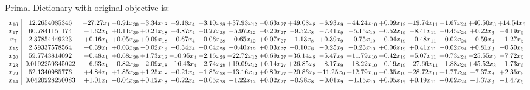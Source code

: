 \documentclass[9pt]{article}
\begin{document}
Primal Dictionary with original objective is:
\[\begin{array}{c| c c@{\hskip 2pt} c@{\hskip 2pt} c@{\hskip 2pt} c@{\hskip 2pt} c@{\hskip 2pt} c@{\hskip 2pt} c@{\hskip 2pt} c@{\hskip 2pt} c@{\hskip 2pt} c@{\hskip 2pt} c@{\hskip 2pt} c@{\hskip 2pt} c@{\hskip 2pt} c@{\hskip 2pt} c@{\hskip 2pt} }
 x_{16}   &  12.2654085346 & -27.27 x_{1} & -0.91 x_{30} & -3.34 x_{18} & -9.18 x_{4} & +  3.10 x_{28} & + 37.93 x_{12} & -0.63 x_{27} & + 49.08 x_{8} & -6.93 x_{9} & -44.24 x_{10} & +  0.09 x_{19} & + 19.74 x_{11} & -1.67 x_{24} & + 40.50 x_{3} & + 14.54 x_{6}\\
 x_{17}   &  60.7841151174 & -1.62 x_{1} & +  0.11 x_{30} & +  0.21 x_{18} & -4.87 x_{4} & -0.27 x_{28} & -5.97 x_{12} & -0.20 x_{27} & -9.52 x_{8} & -7.41 x_{9} & -5.15 x_{10} & -0.52 x_{19} & -8.41 x_{11} & -0.45 x_{24} & +  0.22 x_{3} & -4.19 x_{6}\\
 x_{7}   &  2.37854449223 & +  0.16 x_{1} & +  0.05 x_{30} & +  0.09 x_{18} & -0.67 x_{4} & -0.06 x_{28} & -0.65 x_{12} & +  0.07 x_{27} & -1.13 x_{8} & +  0.39 x_{9} & +  0.75 x_{10} & -0.04 x_{19} & -0.48 x_{11} & +  0.02 x_{24} & -0.59 x_{3} & -1.27 x_{6}\\
 x_{15}   &  2.59337578564 & -0.39 x_{1} & +  0.03 x_{30} & -0.02 x_{18} & -0.34 x_{4} & +  0.04 x_{28} & -0.40 x_{12} & +  0.03 x_{27} & +  0.10 x_{8} & -0.25 x_{9} & +  0.23 x_{10} & +  0.06 x_{19} & +  0.41 x_{11} & -0.02 x_{24} & +  0.81 x_{3} & -0.50 x_{6}\\
 x_{20}   &  59.7743814092 & -0.48 x_{1} & +  0.68 x_{30} & +  1.73 x_{18} & -10.95 x_{4} & -2.16 x_{28} & -22.72 x_{12} & +  0.69 x_{27} & -36.14 x_{8} & -5.47 x_{9} & + 11.79 x_{10} & -0.42 x_{19} & -5.07 x_{11} & +  0.73 x_{24} & -25.55 x_{3} & -7.72 x_{6}\\
 x_{23}   &  0.0192259345022 & -6.63 x_{1} & -0.82 x_{30} & -2.09 x_{18} & -16.43 x_{4} & +  2.74 x_{28} & + 19.09 x_{12} & +  0.14 x_{27} & + 26.85 x_{8} & -8.17 x_{9} & -18.22 x_{10} & -0.19 x_{19} & + 27.66 x_{11} & -1.88 x_{24} & + 45.52 x_{3} & -1.73 x_{6}\\
 x_{22}   &  52.1340985776 & +  4.84 x_{1} & +  1.85 x_{30} & +  1.25 x_{18} & -0.21 x_{4} & -1.85 x_{28} & -13.16 x_{12} & +  0.80 x_{27} & -20.86 x_{8} & + 11.25 x_{9} & + 12.79 x_{10} & -0.35 x_{19} & -28.72 x_{11} & +  1.77 x_{24} & -7.37 x_{3} & +  2.35 x_{6}\\
 x_{14}   &  0.0420228250083 & +  1.01 x_{1} & -0.04 x_{30} & +  0.12 x_{18} & -0.22 x_{4} & -0.05 x_{28} & -1.22 x_{12} & +  0.02 x_{27} & -0.98 x_{8} & -0.01 x_{9} & +  1.15 x_{10} & +  0.05 x_{19} & +  0.19 x_{11} & +  0.02 x_{24} & -1.37 x_{3} & -1.47 x_{6}\\

\end{array}\]
\end{document}
